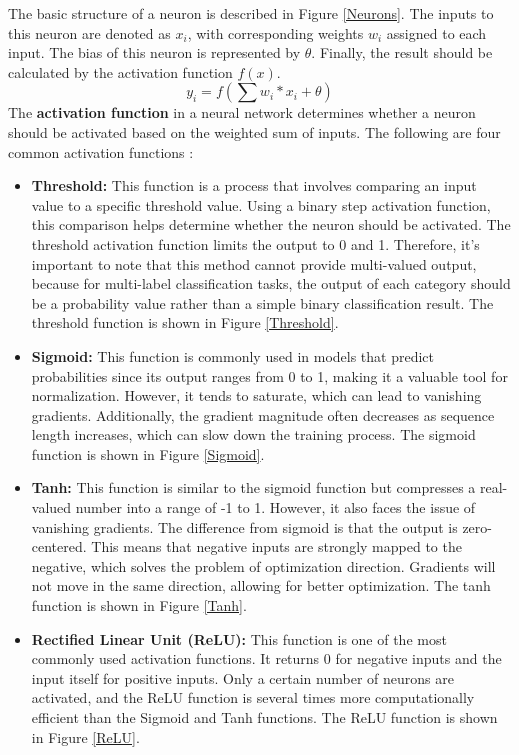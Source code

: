 \documentclass[english,version-2022-01]{uzl-thesis}
\begin{document}
The basic structure of a neuron is described in Figure \ref{Neurons}. The inputs to this neuron are denoted as $x_{i}$, with corresponding weights $w_{i}$ assigned to each input. The bias of this neuron is represented by $\theta$. Finally, the result should be calculated by the activation function $f(x)$.
\\
$$y_{i}=f(\sum w_{i}*x_{i}+\theta)$$
The \textbf{activation function} in a neural network determines whether a neuron should be activated based on the weighted sum of inputs.\cite{sharma2017activation}  The following are four common activation functions :
\begin{itemize}
\item \textbf{Threshold:} This function is a process that involves comparing an input value to a specific threshold value.\cite{sharma2017activation} Using a binary step activation function, this comparison helps determine whether the neuron should be activated. The threshold activation function limits the output to 0 and 1. Therefore, it's important to note that this method cannot provide multi-valued output, because for multi-label classification tasks, the output of each category should be a probability value rather than a simple binary classification result. The threshold function is shown in Figure \ref{Threshold}.
\item \textbf{Sigmoid:} This function is commonly used in models that predict probabilities since its output ranges from 0 to 1, making it a valuable tool for normalization.\cite{sharma2017activation} However, it tends to saturate, which can lead to vanishing gradients. Additionally, the gradient magnitude often decreases as sequence length increases, which can slow down the training process. The sigmoid function is shown in  Figure \ref{Sigmoid}.
\item \textbf{Tanh:} This function is similar to the sigmoid function but compresses a real-valued number into a range of -1 to 1. However, it also faces the issue of vanishing gradients. The difference from sigmoid is that the output is zero-centered. This means that negative inputs are strongly mapped to the negative, which solves the problem of optimization direction.\cite{sharma2017activation} Gradients will not move in the same direction, allowing for better optimization. The tanh function is shown in Figure \ref{Tanh}.
\item \textbf{Rectified Linear Unit (ReLU):} This function is one of the most commonly used activation functions. It returns 0 for negative inputs and the input itself for positive inputs.\cite{sharma2017activation} Only a certain number of neurons are activated, and the ReLU function is several times more computationally efficient than the Sigmoid and Tanh functions. The ReLU function is shown in Figure \ref{ReLU}.

\end{itemize}
\end{document}
